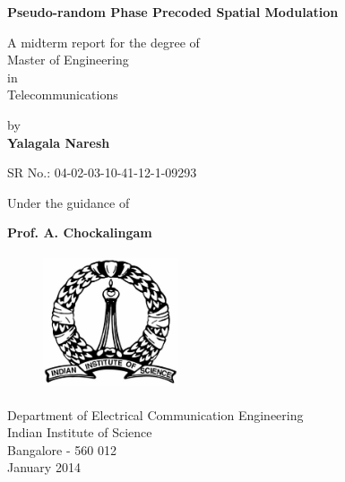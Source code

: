 \documentclass[11pt, onecolumn]{report}
\begin{document}
\begin{titlepage}

\begin{center}
\begin{huge}
\vspace{1 in}
{\bf  Pseudo-random Phase Precoded Spatial Modulation}\\  
\end{huge}
\vspace{0.5 in}
\begin{large}
A midterm report for the degree of\\
{Master of Engineering}\\
in\\
Telecommunications\\
\end{large}
\begin{large}
{by\\}
\vspace{0.1cm}
{\bf Yalagala Naresh\\}
\end{large}
SR No.: 04-02-03-10-41-12-1-09293\\
\vspace{.5in}

\begin{large}
{ Under the guidance of}\\
\end{large}
\vspace{0.2cm}
\begin{large}
{\bf Prof. A. Chockalingam\\}\end{large}
\vspace{1.0in}

\begin{figure}[h]
\begin{center}

\includegraphics[width=4cm,height=4cm]{iisclogo.eps}
\end{center}
\end{figure}

\begin{large}
{ Department of Electrical Communication Engineering\\
Indian Institute of Science\\Bangalore - 560 012}\\
January 2014
\end{large}

\end{center}
\end{titlepage}
\vfill
\eject
\end{document}
